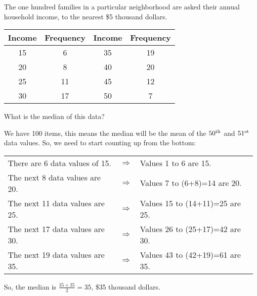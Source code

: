 \documentclass{beamer}
\begin{document}
\begin{frame}
\begin{example}
The one hundred families in a particular neighborhood are asked their annual household income, to the nearest \$5 thousand dollars. 

\vspace{-3mm}
\begin{center}
\begin{tabular}{|c|c||c|c|}
\hline
Income & Frequency & Income & Frequency \\\hline
15 &6 & 35 &19\\\hline
20 &8 & 40 &20\\\hline
25 &11 & 45 &12\\\hline
30 &17 & 50 &7\\\hline
\end{tabular}
\end{center}

\vspace{-3mm}
What is the median of this data?\pause

\vspace{1mm}
We have 100 items, this means the median will be the mean of the $50^{\small\text{th}}$ and $51^{\small\text{st}}$ data values. So, we need to start counting up from the bottom:\pause
\vspace{-6mm}
\begin{center}
\begin{tabular}{lcl}
There are 6 data values of 15. & $\Rightarrow$ & Values 1 to 6 are 15. \\\pause
The next 8 data values are 20. & $\Rightarrow$ & Values 7 to (6+8)=14 are 20. \\\pause
The next 11 data values are 25. & $\Rightarrow$ & Values 15 to (14+11)=25 are 25. \\\pause
The next 17 data values are 30. & $\Rightarrow$ & Values 26 to (25+17)=42 are 30. \\\pause
The next 19 data values are 35. & $\Rightarrow$ & Values 43 to (42+19)=61 are 35.
\end{tabular}
\end{center}\pause

\vspace{-2mm}
So, the median is $\frac{35+35}{2}=35$, \$35 thousand dollars.
\end{example}
\end{frame}
\end{document}
